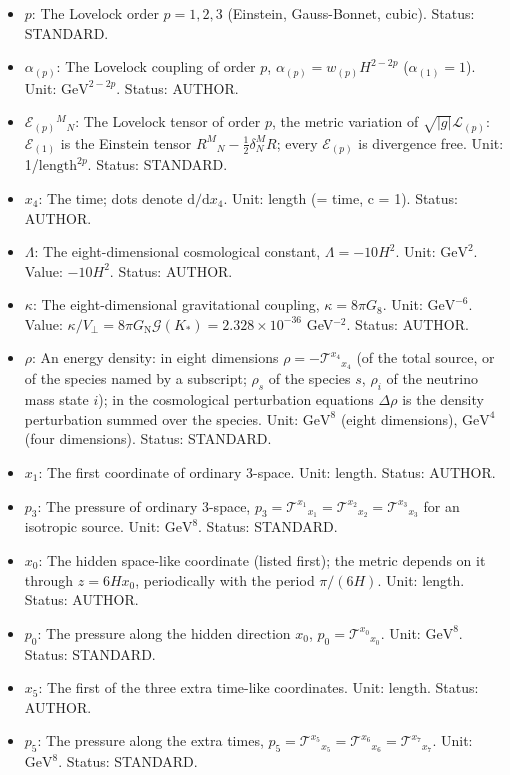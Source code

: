 \documentclass[
  10pt,
]{article}
\providecommand{\tightlist}{%
  \setlength{\itemsep}{0pt}\setlength{\parskip}{0pt}}
\begin{document}
\begin{itemize}
\tightlist
\item
  \(p\): The Lovelock order \(p = 1, 2, 3\) (Einstein, Gauss-Bonnet,
  cubic). Status: STANDARD.
\item
  \(\alpha_{(p)}\): The Lovelock coupling of order \(p\),
  \(\alpha_{(p)} = w_{(p)}H^{2-2p}\) (\(\alpha_{(1)} = 1\)). Unit:
  \(\mathrm{GeV}^{2-2p}\). Status: AUTHOR.
\item
  \(\mathcal{E}_{(p)}{}^M{}_N\): The Lovelock tensor of order \(p\), the
  metric variation of \(\sqrt{\lvert g\rvert}\mathcal{L}_{(p)}\):
  \(\mathcal{E}_{(1)}\) is the Einstein tensor
  \(R^M{}_N - \frac12\delta^M_NR\); every \(\mathcal{E}_{(p)}\) is
  divergence free. Unit: 1/\(\mathrm{length}^{2p}\). Status: STANDARD.
\item
  \(x_4\): The time; dots denote \(\mathrm{d}/\mathrm{d}x_4\). Unit:
  length (= time, c = 1). Status: AUTHOR.
\item
  \(\Lambda\): The eight-dimensional cosmological constant,
  \(\Lambda = -10H^2\). Unit: \(\mathrm{GeV}^{2}\). Value: \(-10H^2\).
  Status: AUTHOR.
\item
  \(\kappa\): The eight-dimensional gravitational coupling,
  \(\kappa = 8\pi G_8\). Unit: \(\mathrm{GeV}^{-6}\). Value:
  \(\kappa/V_\perp = 8\pi G_{\mathrm{N}}\mathcal{G}(K_*) = 2.328\times10^{-36}\)
  GeV\(^{-2}\). Status: AUTHOR.
\item
  \(\rho\): An energy density: in eight dimensions
  \(\rho = -\mathcal{T}^{x_4}{}_{x_4}\) (of the total source, or of the
  species named by a subscript; \(\rho_s\) of the species \(s\),
  \(\rho_i\) of the neutrino mass state \(i\)); in the cosmological
  perturbation equations \(\Delta\rho\) is the density perturbation
  summed over the species. Unit: \(\mathrm{GeV}^{8}\) (eight
  dimensions), \(\mathrm{GeV}^{4}\) (four dimensions). Status: STANDARD.
\item
  \(x_1\): The first coordinate of ordinary 3-space. Unit: length.
  Status: AUTHOR.
\item
  \(p_3\): The pressure of ordinary 3-space,
  \(p_3 = \mathcal{T}^{x_1}{}_{x_1} = \mathcal{T}^{x_2}{}_{x_2} = \mathcal{T}^{x_3}{}_{x_3}\)
  for an isotropic source. Unit: \(\mathrm{GeV}^{8}\). Status: STANDARD.
\item
  \(x_0\): The hidden space-like coordinate (listed first); the metric
  depends on it through \(z = 6Hx_0\), periodically with the period
  \(\pi/(6H)\). Unit: length. Status: AUTHOR.
\item
  \(p_0\): The pressure along the hidden direction \(x_0\),
  \(p_0 = \mathcal{T}^{x_0}{}_{x_0}\). Unit: \(\mathrm{GeV}^{8}\).
  Status: STANDARD.
\item
  \(x_5\): The first of the three extra time-like coordinates. Unit:
  length. Status: AUTHOR.
\item
  \(p_5\): The pressure along the extra times,
  \(p_5 = \mathcal{T}^{x_5}{}_{x_5} = \mathcal{T}^{x_6}{}_{x_6} = \mathcal{T}^{x_7}{}_{x_7}\).
  Unit: \(\mathrm{GeV}^{8}\). Status: STANDARD.
\end{itemize}
\end{document}
